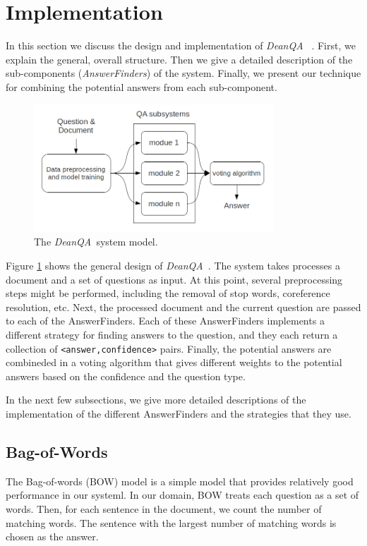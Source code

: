 \documentclass[11pt,letterpaper]{article}
\newcommand{\name}{\emph{DeanQA~}}
\begin{document}
\section{Implementation}
\label{sec:implementation}

In this section we discuss the design and implementation of \name
. First, we explain the general, overall structure. Then we give
a detailed description of the sub-components (\emph{AnswerFinders}) of
the system. Finally, we present our technique for combining the
potential answers from each sub-component.

\begin{figure} 
	\centering
	\includegraphics[width=0.8\textwidth]{model.png}
	\caption{The \name system model.}
	\label{fig:model}
\end{figure}

Figure \ref{fig:model} shows the general design of \name.
The system takes processes a document and a set of questions as input.
At this point, several preprocessing steps might be performed,
including the removal of stop words, coreference resolution, etc.
Next, the processed document and the current question are passed to
each of the AnswerFinders. Each of these AnswerFinders implements a
different strategy for finding answers to the question, and they
each return a collection of \texttt{<answer,confidence>} pairs.
Finally, the potential answers are combineded in a voting algorithm
that gives different weights to the potential answers based on the
confidence and the question type.

In the next few subsections, we give more detailed descriptions of
the implementation of the different AnswerFinders and the
strategies that they use.

\subsection{Bag-of-Words}

The Bag-of-words (BOW) model is a simple model that provides relatively good
performance in our systeml. In our domain, BOW treats each question as a set of
words. Then, for each sentence in the document, we count the number of matching
words. The sentence with the largest number of matching words is chosen as the
answer.
\end{document}

